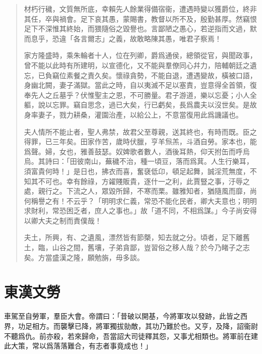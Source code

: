 \begin{quotation}
材朽行穢，文質無所底，幸賴先人餘業得備宿衞，遭遇時變以獲爵位，終非其任，卒與禍會。足下哀其愚，蒙賜書，教督以所不及，殷勤甚厚。然竊恨足下不深惟其終始，而猥隨俗之毀譽也。言鄙陋之愚心，若逆指而文過，默而息乎，恐違「各言爾志」之義，故敢略陳其愚，唯君子察焉！

家方隆盛時，乘朱輪者十人，位在列卿，爵爲通侯，總領從官，與聞政事，曾不能以此時有所建明，以宣德化，又不能與羣僚同心幷力，陪輔朝廷之遺忘，已負竊位素餐之責久矣。懷祿貪勢，不能自退，遭遇變故，橫被口語，身幽北闕，妻子滿獄。當此之時，自以夷滅不足以塞責，豈意得全首領，復奉先人之丘墓乎？伏惟聖主之恩，不可勝量。君子游道，樂以忘憂；小人全軀，說以忘罪。竊自思念，過已大矣，行已虧矣，長爲農夫以沒世矣。是故身率妻子，戮力耕桑，灌園治產，以給公上，不意當復用此爲譏議也。

夫人情所不能止者，聖人弗禁，故君父至尊親，送其終也，有時而既。臣之得罪，已三年矣。田家作苦，歲時伏臘，亨羊炰羔，斗酒自勞。家本也，能爲聲。婦，女也，雅善鼓瑟。奴婢歌者數人，酒後耳熱，仰天拊缶而呼烏烏。其詩曰：「田彼南山，蕪穢不治，種一頃豆，落而爲萁。人生行樂耳，須富貴何時！」是日也，拂衣而喜，奮褎低卬，頓足起舞，誠淫荒無度，不知其不可也。幸有餘祿，方糴賤販貴，逐什一之利，此賈豎之事，汙辱之處，親行之。下流之人，眾毀所歸，不寒而栗。雖雅知者，猶隨風而靡，尚何稱譽之有！不云乎？「明明求仁義，常恐不能化民者，卿大夫意也；明明求財利，常恐困乏者，庶人之事也。」故「道不同，不相爲謀。」今子尚安得以卿大夫之制而責僕哉！

夫土，所興，有、之遺風，漂然皆有節槩，知去就之分。頃者，足下離舊土，臨，山谷之間，舊壤，子弟貪鄙，豈習俗之移人哉？於今乃睹子之志矣。方當盛漢之隆，願勉旃，毋多談。
\end{quotation}
\vspace{-1em}
\theendnotes

\section[光武帝臨淄勞耿弇\quad{\small 東漢文}]{{\normalsize 東漢文}\quad {}勞}
車駕至自勞軍，羣臣大會。帝謂曰：「昔破以開基，今將軍攻以發跡，此皆之西界，功足相方。而襲擊已降，將軍獨拔勍敵，其功乃難於也。又亨，及降，詔衞尉不聽爲仇。前亦殺，若來歸命，吾當詔大司徒釋其怨，又事尤相類也。將軍前在建此大策，常以爲落落難合，有志者事竟成也！」

